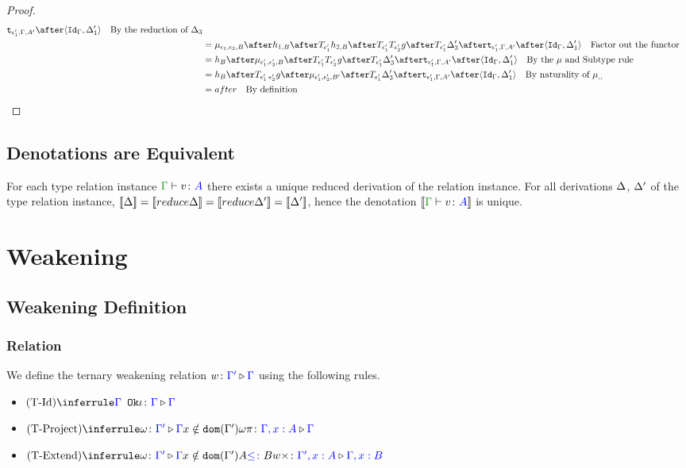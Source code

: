\documentclass{report}
\begin{document}
\begin{framed}
\begin{proof}
\begin{align*}
                        \tstrength{\e_1'}{\G}{A'}\after\pr{\idg}{\D_1'}\qt{By the reduction of $\D_3$}\\
                        &= \bind{\e_1}{\e_2}{B}\after 
                        h_{1, B}\after\T{\e_1'}{h_{2, B}}\after\T{\e_1'}{\T{\e_2'}{g}}\after \T{\e_1'}{\D_3'}\after
                        \tstrength{\e_1'}{\G}{A'}\after\pr{\idg}{\D_1'}\qt{Factor out the functor}\\
                        &= h_B\after\bind{\e_1'}{\e_2'}{B}\after\T{\e_1'}{\T{\e_2'}{g}}\after \T{\e_1'}{\D_3'}\after
                        \tstrength{\e_1'}{\G}{A'}\after\pr{\idg}{\D_1'}\qt{By the $\mu$ and Subtype rule }\\
                        & = h_B\after\T{\e_1'\dot\e_2'}{g}\after\bind{\e_1'}{\e_2'}{B'}\after \T{\e_1'}{\D_3'}\after
                        \tstrength{\e_1'}{\G}{A'}\after\pr{\idg}{\D_1'}\qt{By naturality of $\bind{}{}{}$ }\\
                        & = after \qt{By definition}
                    \end{align*}
    
\end{proof}
\end{framed}

\section{Denotations are Equivalent}
For each type relation instance $\gtyperelation{v}{A}$ there exists a unique reduced derivation of the relation instance. For all derivations $\Delta$, $\Delta'$ of the type relation instance, $\deno{\D} = \deno{\reduce{\D}} = \deno{\reduce{\D'}} = \deno{\D'} $, hence the denotation $\deno{\gtyperelation{v}{A}}$ is unique.


\chapter{Weakening}
\section{Weakening Definition}
\subsection{Relation}
We define the ternary weakening relation $w \colon {\color{blue}\Gamma'} \triangleright {\color {blue} \Gamma}$ using the following rules.


\begin{itemize}
    \item $\ntreeruleI{\tid}{\ok{\G}}{\wrel{\i}{\G}{\G}}$
    \item $\ntreeruleII{\tproject}{\wrel{\w}{\G'}{\G}}{ x \notin \dom{\G'}}{\wrel{\w \pi}{\G, x: A}{\G}}$
    \item $\ntreeruleIII{\textend}{\wrel{\w}{\G'}{\G}}{ x \notin \dom{\G'}}{ A \subtype B}{\wrel{w \x}{\G', x: A}{\G, x: B}}$
\end{itemize}
\end{document}
